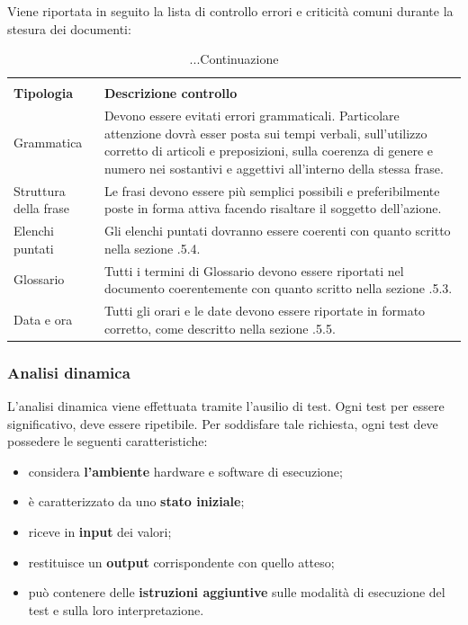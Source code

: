 \noindent Viene riportata in seguito la lista di controllo errori e criticità comuni durante la stesura dei documenti:

\renewcommand{\arraystretch}{2.2}

\begin{longtable}{|C{4cm}|C{8.5cm}|}
	\caption{Tabella per la lista di controllo}\\
	\textbf{Tipologia} & \textbf{Descrizione controllo}\\
	\endfirsthead
	
	\caption[]{...Continuazione}

	\endhead
	
	Grammatica & Devono essere evitati errori grammaticali. Particolare attenzione dovrà esser posta sui tempi verbali, sull'utilizzo corretto di articoli e preposizioni, sulla coerenza di genere e numero nei sostantivi e aggettivi all'interno della stessa frase. \\
	
	Struttura della frase & Le frasi devono essere più semplici possibili e preferibilmente poste in forma attiva facendo risaltare il soggetto dell'azione. \\
	
	Elenchi puntati & Gli elenchi puntati dovranno essere coerenti con quanto scritto nella sezione .5.4. \\
	
	Glossario & Tutti i termini di Glossario devono essere riportati nel documento coerentemente con quanto scritto nella sezione .5.3. \\
	
	Data e ora & Tutti gli orari e le date devono essere riportate in formato corretto, come descritto nella sezione .5.5. \\
	\hline
\end{longtable}



\subsubsection{Analisi dinamica}
L'analisi dinamica viene effettuata tramite l'ausilio di test. Ogni test per essere significativo, deve essere ripetibile. Per soddisfare tale richiesta, ogni test deve possedere le seguenti caratteristiche:
\begin{itemize}
	\item considera \textbf{l'ambiente} hardware e software di esecuzione;
	\item è caratterizzato da uno \textbf{stato iniziale};
	\item riceve in \textbf{input} dei valori;
	\item restituisce un \textbf{output} corrispondente con quello atteso;
	\item può contenere delle \textbf{istruzioni aggiuntive} sulle modalità di esecuzione del test e sulla loro interpretazione.
\end{itemize}

